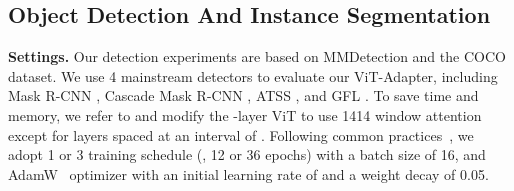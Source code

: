 \documentclass{article} \usepackage{iclr2023_conference,times}
\begin{document}
\subsection{Object Detection And Instance Segmentation}
\label{sec:detection_settings}


\noindent \textbf{Settings.}
Our detection experiments are based on MMDetection \citep{mmdetection} and the COCO \citep{lin2014microsoft} dataset.
We use 4 mainstream detectors to evaluate our ViT-Adapter, including Mask R-CNN \citep{he2017mask}, Cascade Mask R-CNN \citep{cai2019cascade}, ATSS \citep{zhang2020bridging}, and GFL \citep{li2020generalized}. 
To save time and memory, we refer to \citep{li2021benchmarking} and modify the -layer ViT to use 1414 window attention except for layers spaced at an interval of .
Following common practices~\citep{wang2021pyramid}, we adopt 1 or 3 training schedule (\ie, 12 or 36 epochs) with a batch size of 16, and AdamW~\citep{loshchilov2017decoupled} optimizer with an initial learning rate of  and a weight decay of 0.05. 
\end{document}
